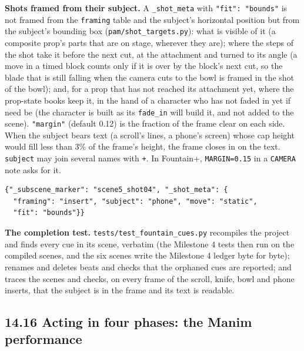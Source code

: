 \documentclass[
  12pt,
  letterpaper,
]{book}
\begin{document}
\textbf{Shots framed from their subject.} A \texttt{\_shot\_meta} with
\texttt{"fit": "bounds"} is not framed from the \texttt{framing} table
and the subject's horizontal position but from the subject's bounding
box (\texttt{pam/shot\_targets.py}): what is visible of it (a composite
prop's parts that are on stage, wherever they are); where the steps of
the shot take it before the next cut, at the attachment and turned to
its angle (a move in a timed block counts only if it is over by the
block's next cut, so the blade that is still falling when the camera
cuts to the bowl is framed in the shot of the bowl); and, for a prop
that has not reached its attachment yet, where the prop-state books keep
it, in the hand of a character who has not faded in yet if need be (the
character is built as its \texttt{fade\_in} will build it, and not added
to the scene). \texttt{"margin"} (default 0.12) is the
fraction of the frame clear on each side. When the subject bears text
(a scroll's lines, a phone's screen) whose cap height would fill less
than 3\% of the frame's height, the frame closes in on the text.
\texttt{subject} may join several names with \texttt{+}. In Fountain+,
\texttt{MARGIN=0.15} in a \texttt{CAMERA} note asks for it.

\begin{verbatim}
{"_subscene_marker": "scene5_shot04", "_shot_meta": {
  "framing": "insert", "subject": "phone", "move": "static",
  "fit": "bounds"}}
\end{verbatim}

\textbf{The completion test.} \texttt{tests/test\_fountain\_cues.py}
recompiles the project and finds every cue in its scene, verbatim (the
Milestone 4 tests then run on the compiled scenes, and the six scenes
write the Milestone 4 ledger byte for byte); renames and deletes beats
and checks that the orphaned cues are reported; and traces the scenes
and checks, on every frame of the scroll, knife, bowl and phone
inserts, that the subject is in the frame and its text is readable.

\subsection{14.16 Acting in four phases: the Manim performance}\label{perform}
\end{document}
